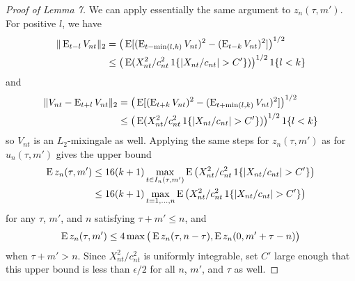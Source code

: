 \documentclass[11pt]{article}
\begin{document}
{\begin{proof}[Proof of Lemma 7]
  We can apply essentially the same argument to $z_n(\tau, m')$. For
  positive $l$, we have
  \begin{align*}
    \| \operatorname{E}_{t-l} V_{nt} \|_2 &=
    \big(\operatorname{E}[(\operatorname{E}_{t-\min(l, k)} V_{nt})^2 - (\operatorname{E}_{t-k} V_{nt})^2]\big)^{1/2} \\
    &\leq \big(\operatorname{E}( X_{nt}^2/c_{nt}^2
    \operatorname{1}\{|X_{nt}/c_{nt}| > C'\}) \big)^{1/2}\operatorname{1}\{l < k\}
  \end{align*}
  and
  \begin{align*}
    \| V_{nt} - \operatorname{E}_{t+l} V_{nt} \|_2
    &= \big(\operatorname{E}[ (\operatorname{E}_{t+k} V_{nt} )^2 - (\operatorname{E}_{t+\min(l,k)} V_{nt})^2] \big)^{1/2}\\
    &\leq \big(\operatorname{E}( X_{nt}^2/c_{nt}^2
    \operatorname{1}\{|X_{nt}/c_{nt}| > C'\})\big)^{1/2} \operatorname{1}\{l < k\}
  \end{align*}
  so $V_{nt}$ is an $L_2$-mixingale as well. Applying the same steps
  for $z_{n}(\tau, m')$ as for $u_n(\tau, m')$ gives the upper bound
  \begin{align*}
    \operatorname{E} z_n(\tau, m')
    &\leq 16 (k+1) \max_{t \in I_n(\tau, m')} \operatorname{E}\big( X_{nt}^2/c_{nt}^2
    \operatorname{1}\{|X_{nt}/c_{nt}| > C'\}\big) \\
    &\leq 16 (k+1) \max_{t = 1,\dots,n} \operatorname{E}\big( X_{nt}^2/c_{nt}^2
    \operatorname{1}\{|X_{nt}/c_{nt}| > C'\}\big)
  \end{align*}
  for any $\tau$, $m'$, and $n$ satisfying $\tau + m' \leq n$, and
  \begin{equation*}
    \operatorname{E} z_n(\tau, m')
    \leq 4 \max\big(\operatorname{E} z_n(\tau, n - \tau),
                    \operatorname{E} z_n(0, m' + \tau - n) \big)
  \end{equation*}
  when $\tau + m' > n$.
  Since $X_{nt}^2/c_{nt}^2$ is uniformly integrable, set $C'$ large
  enough that this upper bound is less than $\epsilon/2$ for all $n$,
  $m'$, and $\tau$ as well.


\end{proof}}
\end{document}

